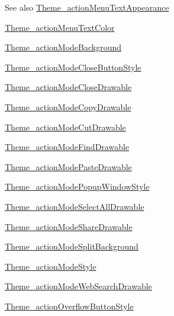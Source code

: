 \begin{DoxySeeAlso}{See also}
\hyperlink{classcheck_1_1test_1_1_r_1_1styleable_af897628603939c74ea86e5ec3ba329a4}{Theme\+\_\+action\+Menu\+Text\+Appearance} 

\hyperlink{classcheck_1_1test_1_1_r_1_1styleable_a46f47f45868d12945f240329c3a79fe7}{Theme\+\_\+action\+Menu\+Text\+Color} 

\hyperlink{classcheck_1_1test_1_1_r_1_1styleable_a51942708f6a610b1ec0a9c2fca839459}{Theme\+\_\+action\+Mode\+Background} 

\hyperlink{classcheck_1_1test_1_1_r_1_1styleable_ab30e73a8022e0a0d45477373a56e8594}{Theme\+\_\+action\+Mode\+Close\+Button\+Style} 

\hyperlink{classcheck_1_1test_1_1_r_1_1styleable_a4a3a5d915cea1a08a892eb22d86aa5b1}{Theme\+\_\+action\+Mode\+Close\+Drawable} 

\hyperlink{classcheck_1_1test_1_1_r_1_1styleable_ada960b6879c62666803bc7cbfd549a66}{Theme\+\_\+action\+Mode\+Copy\+Drawable} 

\hyperlink{classcheck_1_1test_1_1_r_1_1styleable_a46d9dab18374fb132f95dae524a5d910}{Theme\+\_\+action\+Mode\+Cut\+Drawable} 

\hyperlink{classcheck_1_1test_1_1_r_1_1styleable_af1e1008c65426da3eab077f1a462c7cb}{Theme\+\_\+action\+Mode\+Find\+Drawable} 

\hyperlink{classcheck_1_1test_1_1_r_1_1styleable_a537cf24632f0159627a389b005b5ad7d}{Theme\+\_\+action\+Mode\+Paste\+Drawable} 

\hyperlink{classcheck_1_1test_1_1_r_1_1styleable_a7430b605b613f3c152e57fba4ec0f106}{Theme\+\_\+action\+Mode\+Popup\+Window\+Style} 

\hyperlink{classcheck_1_1test_1_1_r_1_1styleable_a0b1f83e691b070515cd68592dacf387b}{Theme\+\_\+action\+Mode\+Select\+All\+Drawable} 

\hyperlink{classcheck_1_1test_1_1_r_1_1styleable_a834d173801ca8819888d149a2adb6a9e}{Theme\+\_\+action\+Mode\+Share\+Drawable} 

\hyperlink{classcheck_1_1test_1_1_r_1_1styleable_a8f38579426c6d3ff9440e1e2dce58bc6}{Theme\+\_\+action\+Mode\+Split\+Background} 

\hyperlink{classcheck_1_1test_1_1_r_1_1styleable_a21f32ef93d16b662bb12165a0ebee2be}{Theme\+\_\+action\+Mode\+Style} 

\hyperlink{classcheck_1_1test_1_1_r_1_1styleable_aa5a92d7f473a39b7ff9ace293dc4d2d5}{Theme\+\_\+action\+Mode\+Web\+Search\+Drawable} 

\hyperlink{classcheck_1_1test_1_1_r_1_1styleable_a43f29fc1f3579d42bcc1e4bbd4c853c6}{Theme\+\_\+action\+Overflow\+Button\+Style} 


\end{DoxySeeAlso}
